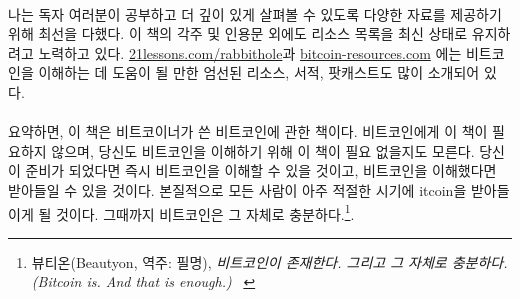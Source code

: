 \paragraph{}
나는 독자 여러분이 공부하고 더 깊이 있게 살펴볼 수 있도록 다양한 자료를 제공하기 위해 최선을 다했다.
이 책의 각주 및 인용문 외에도 리소스 목록을 최신 상태로 유지하려고 노력하고 있다. 
\href{https://21lessons.com/rabbithole}{21lessons.com/rabbithole}과 \href{https://bitcoin-resources.com}{bitcoin-resources.com}
에는 비트코인을 이해하는 데 도움이 될 만한 엄선된 리소스, 서적, 팟캐스트도 많이 소개되어 있다.

\paragraph{}
요약하면, 이 책은 비트코이너가 쓴 비트코인에 관한 책이다. 
비트코인에게 이 책이 필요하지 않으며, 당신도 비트코인을 이해하기 위해 이 책이 필요 없을지도 모른다. 
당신이 준비가 되었다면 즉시 비트코인을 이해할 수 있을 것이고, 
비트코인을 이해했다면 받아들일 수 있을 것이다. 
본질적으로 모든 사람이 아주 적절한 시기에 \bitcoinB{}itcoin을 받아들이게 될 것이다. 
그때까지 비트코인은 그 자체로 충분하다.\footnote{뷰티온(Beautyon, 역주: 필명), \textit{비트코인이 존재한다. 그리고 그 자체로 충분하다. (Bitcoin is. And that is enough.)} ~\cite{bitcoin-is}}.